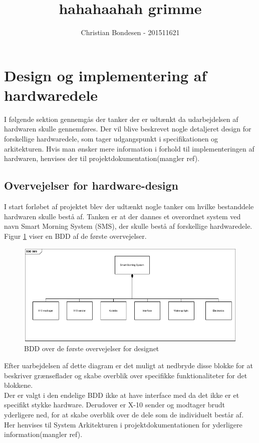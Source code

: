 \documentclass[11pt]{article}
\title{hahahaahah grimme}
\author{Christian Bondesen - 201511621}
\begin{document}
\maketitle
\section{Design og implementering af hardwaredele}
I følgende sektion gennemgås der tanker der er udtænkt da udarbejdelsen af hardwaren skulle gennemføres. Der vil blive beskrevet nogle detaljeret design for forskellige hardwaredele, som tager udgangspunkt i specifikationen og arkitekturen. Hvis man ønsker mere information i forhold til implementeringen af hardwaren, henvises der til projektdokumentation(mangler ref).

\subsection*{Overvejelser for hardware-design}
I start forløbet af projektet blev der udtænkt nogle tanker om hvilke bestanddele hardwaren skulle bestå af. Tanken er at der dannes et overordnet system ved navn Smart Morning System (SMS), der skulle bestå af forskellige hardwaredele. Figur \ref{fig:overvejelserBDD} viser en BDD af de første overvejelser. 

	\begin{figure}[ht]
	 	\centering
	 	\includegraphics[scale = 0.8]{BDD-overvejelser-SMS}
	 	\caption{BDD over de første overvejelser for designet}
	 	\label{fig:overvejelserBDD}
	 \end{figure} 

Efter uarbejdelsen af dette diagram er det muligt at nedbryde disse blokke for at beskriver grænseflader og skabe overblik over specifikke funktionaliteter for det blokkene.\\
Der er valgt i den endelige BDD ikke at have interface med da det ikke er et specifikt stykke hardware. Derudover er X-10 sender og modtager brudt yderligere ned, for at skabe overblik over de dele som de individuelt består af. Her henvises til System Arkitekturen i projektdokumentationen for yderligere information(mangler ref).
\end{document}
